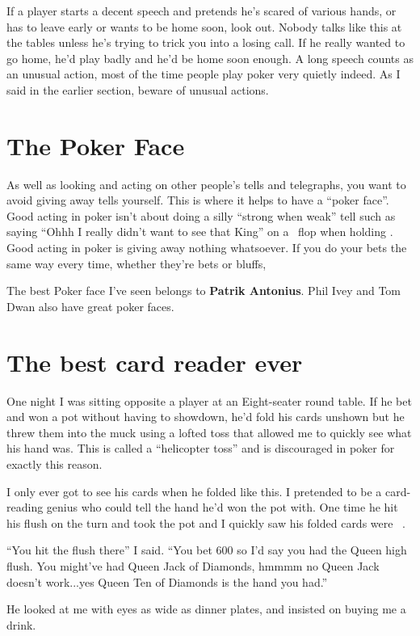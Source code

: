 If a player starts a decent speech and pretends he's scared of various
hands, or has to leave early or wants to be home soon, look out.
Nobody talks like this at the tables unless he's trying to trick
you into a losing call. If he really wanted to go home, he'd play
badly and he'd be home soon enough. A long speech counts as an unusual
action, most of the time people play poker very quietly indeed. As I
said in the earlier section, beware of unusual actions.

\section{The Poker Face}

As well as looking and acting on other people's tells and telegraphs,
you want to avoid giving away tells yourself. This is where it helps
to have a ``poker face''. Good acting in poker isn't about doing
a silly ``strong when weak'' tell such as saying ``Ohhh I really
didn't want to see that King'' on a \Kh\Qd\eigc\ flop when holding \Ks\Kc.
Good acting in poker is giving away nothing whatsoever. If you do your
bets the same way every time, whether they're bets or bluffs, 

The best Poker face I've seen belongs to \textbf{Patrik
Antonius}. Phil Ivey and Tom Dwan also have great poker faces.

\section{The best card reader ever}

One night I was sitting opposite a player at an Eight-seater round
table. If he bet and won a pot without having to showdown, he'd
fold his cards unshown but he threw them into the muck using a lofted toss
that allowed me to quickly see what his hand was. This is called
a ``helicopter toss'' and is discouraged in poker for exactly this reason.

I only ever got to see his cards when he folded like this. I pretended
to be a card-reading genius who could tell the hand he'd won the pot
with. One time he hit his flush on the turn and took the pot and I
quickly saw his folded cards were \Qd\tend\ .

``You hit the flush there'' I said. ``You bet 600 so I'd
say you had the Queen high flush. You might've had Queen Jack of Diamonds,
hmmmm no Queen Jack doesn't work...yes Queen Ten of Diamonds is the hand
you had.''

He looked at me with eyes as wide as dinner plates, and insisted on buying
me a drink.

